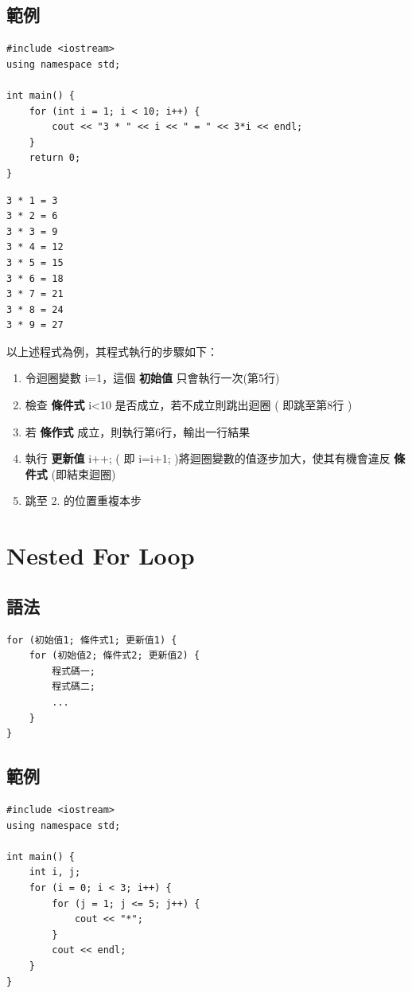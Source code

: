 \documentclass[12pt,a4paper]{article}
\begin{document}
\subsection{範例}
\label{sec:org18b9502}
\lstset{breaklines=true,language=cpp,label= ,caption= ,captionpos=b,firstnumber=1,numbers=left}
\begin{lstlisting}
#include <iostream>
using namespace std;

int main() {
    for (int i = 1; i < 10; i++) {
        cout << "3 * " << i << " = " << 3*i << endl;
    }
    return 0;
}
\end{lstlisting}

\begin{verbatim}
3 * 1 = 3
3 * 2 = 6
3 * 3 = 9
3 * 4 = 12
3 * 5 = 15
3 * 6 = 18
3 * 7 = 21
3 * 8 = 24
3 * 9 = 27
\end{verbatim}


以上述程式為例，其程式執行的步驟如下：
\begin{enumerate}
\item 令迴圈變數 i=1，這個 \textbf{初始值} 只會執行一次(第5行)
\item 檢查 \textbf{條件式} i<10 是否成立，若不成立則跳出迴圈 ( 即跳至第8行 )
\item 若 \textbf{條作式} 成立，則執行第6行，輸出一行結果
\item 執行 \textbf{更新值} i++; ( 即 i=i+1; )將迴圈變數的值逐步加大，使其有機會違反 \textbf{條件式} (即結束迴圈)
\item 跳至 2. 的位置重複本步
\end{enumerate}

\section{Nested For Loop}
\label{cpp_nested_for}
\subsection{語法}
\label{sec:org8a8c433}
\lstset{breaklines=true,language=cpp,label= ,caption= ,captionpos=b,firstnumber=1,numbers=left}
\begin{lstlisting}
for (初始值1; 條件式1; 更新值1) {
    for (初始值2; 條件式2; 更新值2) {
        程式碼一;
        程式碼二;
        ...
    }
}
\end{lstlisting}
\subsection{範例}
\label{sec:org251efd1}
\lstset{breaklines=true,language=cpp,label= ,caption= ,captionpos=b,firstnumber=1,numbers=left}
\begin{lstlisting}
#include <iostream>
using namespace std;

int main() {
    int i, j;
    for (i = 0; i < 3; i++) {
        for (j = 1; j <= 5; j++) {
            cout << "*";
        }
        cout << endl;
    }
}
\end{lstlisting}
\end{document}
